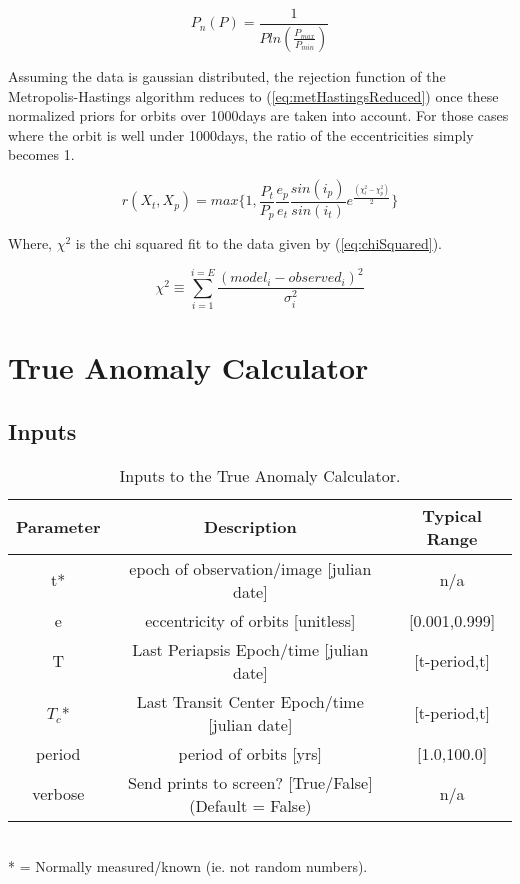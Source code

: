 \documentclass[10pt,preprint]{aastex}
\begin{document}
\begin{equation}\label{eq:pProb}
P_n(P) =  \frac{1}{P ln(\frac{P_{max}}{P_{min}})}
\end{equation}

Assuming the data is gaussian distributed, the rejection function of the Metropolis-Hastings algorithm reduces to (\ref{eq:metHastingsReduced}) once these normalized priors for orbits over 1000days are taken into account.  For those cases where the orbit is well under 1000days, the ratio of the eccentricities simply becomes 1.

\begin{equation}\label{eq:metHastingsReduced}
r(X_t,X_p) = max\bigg\{1, \frac{P_t}{P_p}\frac{e_p}{e_t}\frac{sin(i_p)}{sin(i_t)}e^{\frac{(\chi^2_t - \chi^2_p)}{2}} \bigg\}
\end{equation}

Where, $\chi^2$ is the chi squared fit to the data given by (\ref{eq:chiSquared}).

\begin{equation}\label{eq:chiSquared}
{\chi}^{2} \equiv  \sum_{i=1}^{i=E} \frac{(model_i - observed_i)^{2}}{\sigma^{2}_i}
\end{equation}

\pagebreak
\section{True Anomaly Calculator}
\subsection{Inputs}

\begin{table}[h]
\centering
\caption{ Inputs to the True Anomaly Calculator.}
\begin{tabular}{c c c}
\hline\hline
Parameter & Description & Typical Range \\
\hline
t* & epoch of observation/image [julian date] & n/a\\
e & eccentricity of orbits [unitless] & [0.001,0.999]\\
T & Last Periapsis Epoch/time [julian date] & [t-period,t]\\
$T_c$* & Last Transit Center Epoch/time [julian date] & [t-period,t]\\
period & period of orbits [yrs] & [1.0,100.0]\\
verbose & Send prints to screen? [True/False](Default = False) & n/a\\
\hline
\end{tabular}
\\
 * = Normally measured/known (ie. not random numbers).
\end{table}
\end{document}
